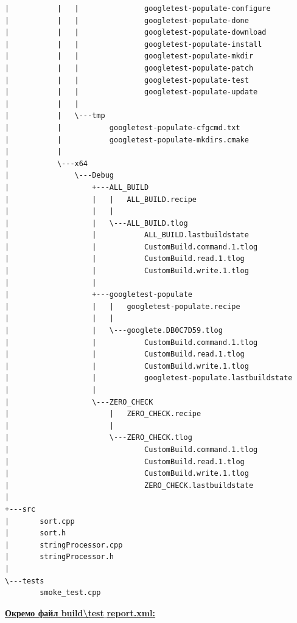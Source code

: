 \documentclass[12pt,a4paper]{article}
\begin{document}
\begin{verbatim}
|           |   |               googletest-populate-configure
|           |   |               googletest-populate-done
|           |   |               googletest-populate-download
|           |   |               googletest-populate-install
|           |   |               googletest-populate-mkdir
|           |   |               googletest-populate-patch
|           |   |               googletest-populate-test
|           |   |               googletest-populate-update
|           |   |               
|           |   \---tmp
|           |           googletest-populate-cfgcmd.txt
|           |           googletest-populate-mkdirs.cmake
|           |           
|           \---x64
|               \---Debug
|                   +---ALL_BUILD
|                   |   |   ALL_BUILD.recipe
|                   |   |   
|                   |   \---ALL_BUILD.tlog
|                   |           ALL_BUILD.lastbuildstate
|                   |           CustomBuild.command.1.tlog
|                   |           CustomBuild.read.1.tlog
|                   |           CustomBuild.write.1.tlog
|                   |           
|                   +---googletest-populate
|                   |   |   googletest-populate.recipe
|                   |   |   
|                   |   \---googlete.DB0C7D59.tlog
|                   |           CustomBuild.command.1.tlog
|                   |           CustomBuild.read.1.tlog
|                   |           CustomBuild.write.1.tlog
|                   |           googletest-populate.lastbuildstate
|                   |           
|                   \---ZERO_CHECK
|                       |   ZERO_CHECK.recipe
|                       |   
|                       \---ZERO_CHECK.tlog
|                               CustomBuild.command.1.tlog
|                               CustomBuild.read.1.tlog
|                               CustomBuild.write.1.tlog
|                               ZERO_CHECK.lastbuildstate
|                               
+---src
|       sort.cpp
|       sort.h
|       stringProcessor.cpp
|       stringProcessor.h
|       
\---tests
        smoke_test.cpp
    \end{verbatim}

    \textbf{\underline{Окремо файл build\textbackslash test$\_$report.xml:}}
\end{document}
